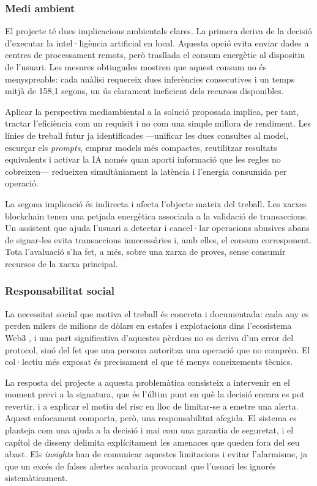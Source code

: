 \subsubsection{Medi ambient}

El projecte té dues implicacions ambientals clares. La primera deriva de la decisió d'executar la intel·ligència artificial en local. Aquesta opció evita enviar dades a centres de processament remots, però trasllada el consum energètic al dispositiu de l'usuari. Les mesures obtingudes mostren que aquest consum no és menyspreable: cada anàlisi requereix dues inferències consecutives i un temps mitjà de 158,1 segons, un ús clarament ineficient dels recursos disponibles.

Aplicar la perspectiva mediambiental a la solució proposada implica, per tant, tractar l'eficiència com un requisit i no com una simple millora de rendiment. Les línies de treball futur ja identificades —unificar les dues consultes al model, escurçar els \textit{prompts}, emprar models més compactes, reutilitzar resultats equivalents i activar la IA només quan aporti informació que les regles no cobreixen— redueixen simultàniament la latència i l'energia consumida per operació.

La segona implicació és indirecta i afecta l'objecte mateix del treball. Les xarxes blockchain tenen una petjada energètica associada a la validació de transaccions. Un assistent que ajuda l'usuari a detectar i cancel·lar operacions abusives abans de signar-les evita transaccions innecessàries i, amb elles, el consum corresponent. Tota l'avaluació s'ha fet, a més, sobre una xarxa de proves, sense consumir recursos de la xarxa principal.

\subsubsection{Responsabilitat social}

La necessitat social que motiva el treball és concreta i documentada: cada any es perden milers de milions de dòlars en estafes i explotacions dins l'ecosistema Web3 \cite{chainalysis_stolen_2024,certik_hack3d_2024}, i una part significativa d'aquestes pèrdues no es deriva d'un error del protocol, sinó del fet que una persona autoritza una operació que no comprèn. El col·lectiu més exposat és precisament el que té menys coneixements tècnics.

La resposta del projecte a aquesta problemàtica consisteix a intervenir en el moment previ a la signatura, que és l'últim punt en què la decisió encara es pot revertir, i a explicar el motiu del risc en lloc de limitar-se a emetre una alerta. Aquest enfocament comporta, però, una responsabilitat afegida. El sistema es planteja com una ajuda a la decisió i mai com una garantia de seguretat, i el capítol de disseny delimita explícitament les amenaces que queden fora del seu abast. Els \textit{insights} han de comunicar aquestes limitacions i evitar l'alarmisme, ja que un excés de falses alertes acabaria provocant que l'usuari les ignorés sistemàticament.

